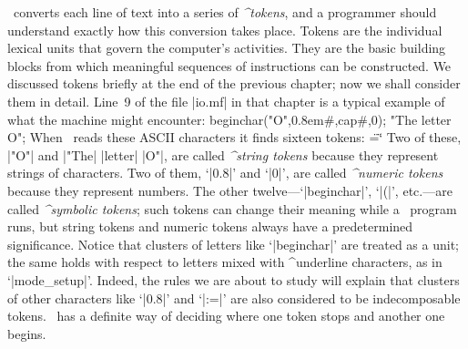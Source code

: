 {\MF\ converts each line of text into a series of {\sl ^{tokens}}, and a
programmer should understand exactly how this conversion takes place.
Tokens are the individual lexical units that govern the computer's
activities. They are the basic building blocks from which meaningful
sequences of instructions can be constructed. We discussed tokens briefly
at the end of the previous chapter; now we shall consider them in detail.
Line~9 of the file |io.mf| in that chapter is a typical example of what
the machine might encounter:
\begintt
beginchar("O",0.8em#,cap#,0); "The letter O";
\endtt
When \MF\ reads these ASCII characters it finds sixteen tokens:
\begindisplay \chardef\"=`\" \openup 2pt
\quad\ttok{(}\quad{}\quad
 \ttok{,}\quad{}\quad{}\quad\ttok{\#}\quad\ttok{,}\cr
{}\quad\ttok{\#}\quad\ttok{,}\quad{}\quad
 \ttok{)}\quad\ttok{;}\quad{}\quad\ttok{;}\cr
\enddisplay
Two of these, |"O"| and |"The| |letter| |O"|, are called {\sl^{string tokens}\/}
because they represent strings of characters. Two of them, `|0.8|' and `|0|',
are called {\sl^{numeric tokens}\/} because they represent numbers. The
other twelve---`|beginchar|', `|(|', etc.---are called {\sl^{symbolic
tokens}\/}; such tokens can change their meaning while a \MF\ program runs,
but string tokens and numeric tokens always have a predetermined significance.
Notice that clusters of letters like `|beginchar|' are treated as a unit;
the same holds with respect to letters mixed with ^{underline} characters,
as in `|mode_setup|'. Indeed,
the rules we are about to study will explain that clusters of other
characters like `|0.8|' and `|:=|' are also considered to be
indecomposable tokens. \MF\ has a definite way of deciding where one
token stops and another one begins.

}
